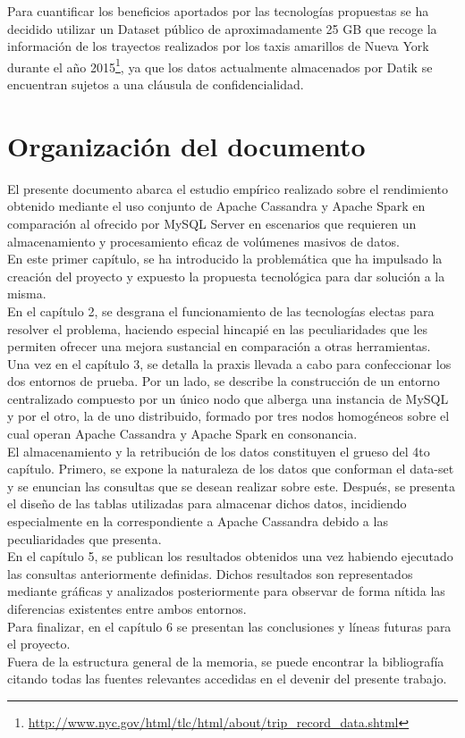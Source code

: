 Para cuantificar los beneficios aportados por las tecnologías propuestas se ha decidido utilizar un Dataset público de aproximadamente 25 GB que recoge la información de los trayectos realizados por los taxis amarillos de Nueva York durante el año 2015\footnote{\url{http://www.nyc.gov/html/tlc/html/about/trip_record_data.shtml}}, ya que los datos actualmente almacenados por Datik se encuentran sujetos a una cláusula de confidencialidad.

\section{Organización del documento}

El presente documento abarca el estudio empírico realizado sobre el rendimiento obtenido mediante el uso conjunto de Apache Cassandra y Apache Spark en comparación al ofrecido por MySQL Server en escenarios que requieren un almacenamiento y procesamiento eficaz de volúmenes masivos de datos.\\

En este primer capítulo, se ha introducido la problemática que ha impulsado la creación del proyecto y expuesto la propuesta tecnológica para dar solución a la misma.\\

En el capítulo 2, se desgrana el funcionamiento de las tecnologías electas para resolver el problema, haciendo especial hincapié en las peculiaridades que les permiten ofrecer una mejora sustancial en comparación a otras herramientas.\\

Una vez en el capítulo 3, se detalla la praxis llevada a cabo para confeccionar los dos entornos de prueba. Por un lado, se describe la construcción de un entorno centralizado compuesto por un único nodo que alberga una instancia de MySQL y por el otro, la de uno distribuido, formado por tres nodos homogéneos sobre el cual operan Apache Cassandra y Apache Spark en consonancia.\\ 

El almacenamiento y la retribución de los datos constituyen el grueso del 4to capítulo. Primero, se expone la naturaleza de los datos que conforman el data-set y se enuncian las consultas que se desean realizar sobre este. Después, se presenta el diseño de las tablas utilizadas para almacenar dichos datos, incidiendo especialmente en la correspondiente a Apache Cassandra debido a las peculiaridades que presenta.\\ 

En el capítulo 5, se publican los resultados obtenidos una vez habiendo ejecutado las consultas anteriormente definidas. Dichos resultados son representados mediante gráficas y analizados posteriormente para observar de forma nítida las diferencias existentes entre ambos entornos.\\

Para finalizar, en el capítulo 6 se presentan las conclusiones y líneas futuras para el proyecto.\\

Fuera de la estructura general de la memoria, se puede encontrar la bibliografía citando todas las fuentes relevantes accedidas en el devenir del presente trabajo.